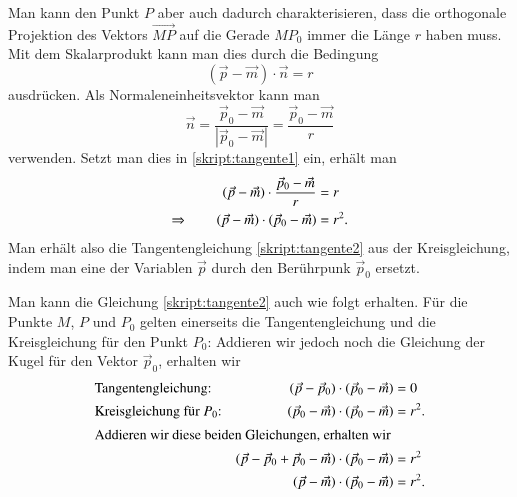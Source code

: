 Man kann den Punkt $P$ aber auch dadurch charakterisieren, dass die
orthogonale Projektion des Vektors $\overrightarrow{MP}$ auf die
Gerade $MP_0$ immer die Länge $r$ haben muss. 
Mit dem Skalarprodukt kann man dies durch die Bedingung
\begin{equation}
(\vec{p}-\vec{m})\cdot \vec n = r
\label{skript:tangente1}
\end{equation}
ausdrücken.
Als Normaleneinheitsvektor kann man
\[
\vec{n}
=
\frac{\vec{p}_0-\vec{m}}{|\vec{p}_0-\vec{m}|}
= 
\frac{\vec{p}_0-\vec{m}}{r}
\]
verwenden.
Setzt man dies in \ref{skript:tangente1} ein, erhält man
\begin{align}
(\vec{p}-\vec{m})\cdot
\frac{\vec{p}_0-\vec{m}}{r}
&=
r
\notag
\\
\Rightarrow\qquad
(\vec{p}-\vec{m})\cdot
(\vec{p}_0-\vec{m})
&=
r^2.
\label{skript:tangente2}
\end{align}
Man erhält also die Tangentengleichung \ref{skript:tangente2}
aus der Kreisgleichung, indem man eine der Variablen $\vec{p}$
durch den Berührpunk $\vec{p}_0$ ersetzt.

Man kann die Gleichung \ref{skript:tangente2} auch wie folgt erhalten.
Für die Punkte $M$, $P$ und $P_0$ gelten einerseits die Tangentengleichung
\label{eqn-kugeltangente} und die Kreisgleichung für den Punkt $P_0$:
Addieren wir jedoch noch die Gleichung
der Kugel für den Vektor $\vec p_0$, erhalten wir
\begin{align*}
&\text{Tangentengleichung:}
&
(\vec p-\vec p_0)\cdot(\vec p_0-\vec m)&=0\\
&\text{Kreisgleichung für $P_0$:}
&
(\vec p_0-\vec m)\cdot(\vec p_0-\vec m)&=r^2.\\
\intertext{Addieren wir diese beiden Gleichungen, erhalten wir}
&&(\vec{p}-\vec{p}_0+\vec{p}_0-\vec m)\cdot(\vec p_0-\vec m)&=r^2
\\
&&(\vec p-\vec m)\cdot(\vec p_0-\vec m)&=r^2.
\end{align*}

%
%
